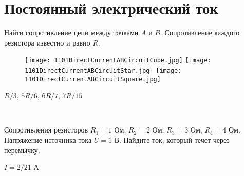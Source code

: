 \section{Постоянный электрический ток}

\begin{ex}
Найти сопротивление цепи между точками $A$ и $B$. Сопротивление каждого резистора известно и равно $R$.
\begin{center}
\end{center}
\begin{figure}[H]
\centering
\texttt{[image: 1101DirectCurrentABCircuitCube.jpg]}
\texttt{[image: 1101DirectCurrentABCircuitStar.jpg]}
\texttt{[image: 1101DirectCurrentABCircuitSquare.jpg]}
\end{figure}
\begin{ans}
$R/3$, $5R/6$, $6R/7$, $7R/15$
\end{ans}
\end{ex}

\begin{ex}
\hspace{0pt} \\
\begin{minipage}{.65\textwidth}
Сопротивления резисторов $R_1 = 1$ Ом, $R_2 = 2$ Ом, $R_3 = 3$ Ом, $R_4 =4$ Ом. 
Напряжение источника тока $U = 1$ В. Найдите ток, который течет через перемычку.
\end{minipage}
\begin{minipage}{.35\textwidth}
\centering
{}
\end{minipage}
\begin{ans}
$I = 2/21$ А
\end{ans}
\end{ex}

